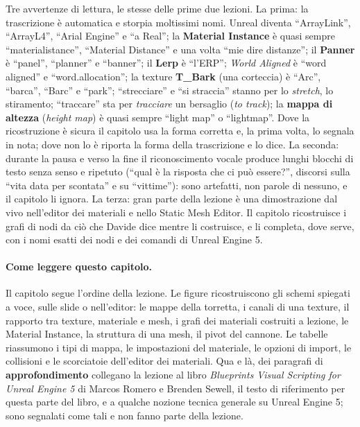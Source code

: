Tre avvertenze di lettura, le stesse delle prime due lezioni. La prima: la trascrizione
è automatica e storpia moltissimi nomi. Unreal diventa ``ArrayLink'', ``ArrayL4'',
``Arial Engine'' e ``a Real''; la \textbf{Material Instance} è quasi sempre
``materialistance'', ``Material Distance'' e una volta ``mie dire distanze''; il
\textbf{Panner} è ``panel'', ``planner'' e ``banner''; il \textbf{Lerp} è ``l'ERP'';
\emph{World Aligned} è ``word aligned'' e ``word.allocation''; la texture
\textbf{T\_Bark} (una corteccia) è ``Arc'', ``barca'', ``Barc'' e ``park''; ``strecciare''
e ``si straccia'' stanno per lo \emph{stretch}, lo stiramento; ``traccare'' sta per
\emph{tracciare} un bersaglio (\emph{to track}); la \textbf{mappa di altezza}
(\emph{height map}) è quasi sempre ``light map'' o ``lightmap''. Dove la ricostruzione
è sicura il capitolo usa la forma corretta e, la prima volta, lo segnala in nota; dove
non lo è riporta la forma della trascrizione e lo dice. La seconda: durante la pausa e
verso la fine il riconoscimento vocale produce lunghi blocchi di testo senza senso e
ripetuto (``qual è la risposta che ci può essere?'', discorsi sulla ``vita data per
scontata'' e su ``vittime''): sono artefatti, non parole di nessuno, e il capitolo li
ignora. La terza: gran parte della lezione è una dimostrazione dal vivo nell'editor dei
materiali e nello Static Mesh Editor. Il capitolo ricostruisce i grafi di nodi da ciò
che Davide dice mentre li costruisce, e li completa, dove serve, con i nomi esatti dei
nodi e dei comandi di Unreal Engine 5.

\paragraph{Come leggere questo capitolo.} Il capitolo segue l'ordine della lezione. Le
figure ricostruiscono gli schemi spiegati a voce, sulle slide o nell'editor: le mappe
della torretta, i canali di una texture, il rapporto tra texture, materiale e mesh, i
grafi dei materiali costruiti a lezione, le Material Instance, la struttura di una
mesh, il pivot del cannone. Le tabelle riassumono i tipi di mappa, le impostazioni del
materiale, le opzioni di import, le collisioni e le scorciatoie dell'editor dei
materiali. Qua e là, dei paragrafi di \textbf{approfondimento} collegano la lezione al
libro \emph{Blueprints Visual Scripting for Unreal Engine 5} di Marcos Romero e Brenden
Sewell, il testo di riferimento per questa parte del libro, e a qualche nozione tecnica
generale su Unreal Engine 5; sono segnalati come tali e non fanno parte della lezione.

